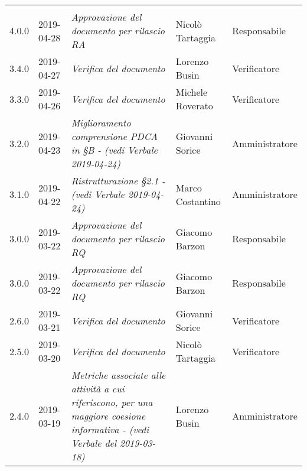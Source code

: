 \newpage 
\section*{}
	\begin{longtable}{C{2cm}|C{2.5cm}|C{4.5cm}|C{2.5cm}|C{3cm}}

		 &  &  &  &   \\
		\endhead
		
		4.0.0 & 2019-04-28 & \emph{Approvazione del documento per rilascio RA} & Nicolò Tartaggia & Responsabile \\
		\hline
		
		3.4.0 & 2019-04-27 & \emph{Verifica del documento} & Lorenzo Busin & Verificatore \\
		\hline
		
		3.3.0 & 2019-04-26 & \emph{Verifica del documento} & Michele Roverato & Verificatore \\
		\hline
		
		3.2.0 & 2019-04-23 & \emph{Miglioramento comprensione PDCA in §B - (vedi Verbale 2019-04-24)} & Giovanni Sorice & Amministratore \\
		\hline
		
		3.1.0 & 2019-04-22 & \emph{Ristrutturazione §2.1 -(vedi Verbale 2019-04-24)} & Marco Costantino & Amministratore \\
		\hline
		
		3.0.0 & 2019-03-22 & \emph{Approvazione del documento per rilascio RQ} & Giacomo Barzon & Responsabile \\
		\hline
		
		3.0.0 & 2019-03-22 & \emph{Approvazione del documento per rilascio RQ} & Giacomo Barzon & Responsabile \\
		\hline
		
		2.6.0 & 2019-03-21 & \emph{Verifica del documento}  & Giovanni Sorice & Verificatore  \\
		\hline
		
		2.5.0 & 2019-03-20 & \emph{Verifica del documento} & Nicolò Tartaggia & Verificatore  \\
		\hline
		
		2.4.0 & 2019-03-19 & \emph{Metriche associate alle attività a cui riferiscono, per una maggiore coesione informativa - (vedi Verbale del 2019-03-18)} & Lorenzo Busin & Amministratore \\
		\hline
		

\end{longtable}
